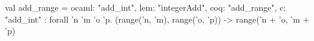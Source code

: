 val add_range = {ocaml: "add_int", lem: "integerAdd", coq: "add_range", c: "add_int"} : forall 'n 'm 'o 'p.
  (range('n, 'm), range('o, 'p)) -> range('n + 'o, 'm + 'p)
